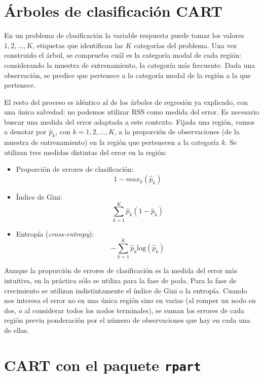 \documentclass[]{book}
\theoremstyle{break}
\theoremstyle{definition}
\theoremstyle{definition}
\theoremstyle{definition}
\theoremstyle{remark}
\begin{document}
\section{Árboles de clasificación
CART}\label{uxe1rboles-de-clasificaciuxf3n-cart}

En un problema de clasificación la variable respuesta puede tomar los
valores \(1, 2, \ldots, K\), etiquetas que identifican las \(K\)
categorías del problema. Una vez construido el árbol, se comprueba cuál
es la categoría modal de cada región: considerando la muestra de
entrenamiento, la categoría más frecuente. Dada una observación, se
predice que pertenece a la categoría modal de la región a la que
pertenece.

El resto del proceso es idéntico al de los árboles de regresión ya
explicado, con una única salvedad: no podemos utilizar RSS como medida
del error. Es necesario buscar una medida del error adaptada a este
contexto. Fijada una región, vamos a denotar por \(\widehat p_{k}\), con
\(k = 1, 2, \ldots, K\), a la proporción de observaciones (de la muestra
de entrenamiento) en la región que pertenecen a la categoría \(k\). Se
utilizan tres medidas distintas del error en la región:

\begin{itemize}
\item
  Proporción de errores de clasificación:
  \[1 - max_{k} (\widehat p_{k})\]
\item
  Índice de Gini: \[\sum_{k=1}^K \widehat p_{k} (1 - \widehat p_{k})\]
\item
  Entropía (\emph{cross-entropy}):
  \[- \sum_{k=1}^K \widehat p_{k} \text{log}(\widehat p_{k})\]
\end{itemize}

Aunque la proporción de errores de clasificación es la medida del error
más intuitiva, en la práctica sólo se utiliza para la fase de poda. Para
la fase de crecimiento se utilizan indistintamente el índice de Gini o
la entropía. Cuando nos interesa el error no en una única región sino en
varias (al romper un nodo en dos, o al considerar todos los nodos
terminales), se suman los errores de cada región previa ponderación por
el número de observaciones que hay en cada una de ellas.

\section{\texorpdfstring{CART con el paquete
\texttt{rpart}}{CART con el paquete rpart}}\label{cart-con-el-paquete-rpart}
\end{document}
